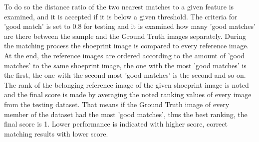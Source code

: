 \documentclass[draft,final]{vutinfth} %
\begin{document}
To do so the distance ratio of the two nearest matches to a given feature is examined, and it is accepted if it is below a given threshold.
The criteria for 'good match' is set to 0.8 for testing and it is examined how many 'good matches' are there between the sample and the Ground Truth images separately.
During the matching process the shoeprint image is compared to every reference image.
At the end, the reference images are ordered according to the amount of 'good matches' to the same shoeprint image, the one with the most 'good matches' is the first, the one with the second most 'good matches' is the second and so on.
The rank of the belonging reference image of the given shoeprint image is noted and the final score is made by averaging the noted ranking values  of every image from the testing dataset.
That means if the Ground Truth image of every member of the dataset had the most 'good matches', thus the best ranking, the final score is 1.
Lower performance is indicated with higher score, correct matching results with lower score.
\end{document}
